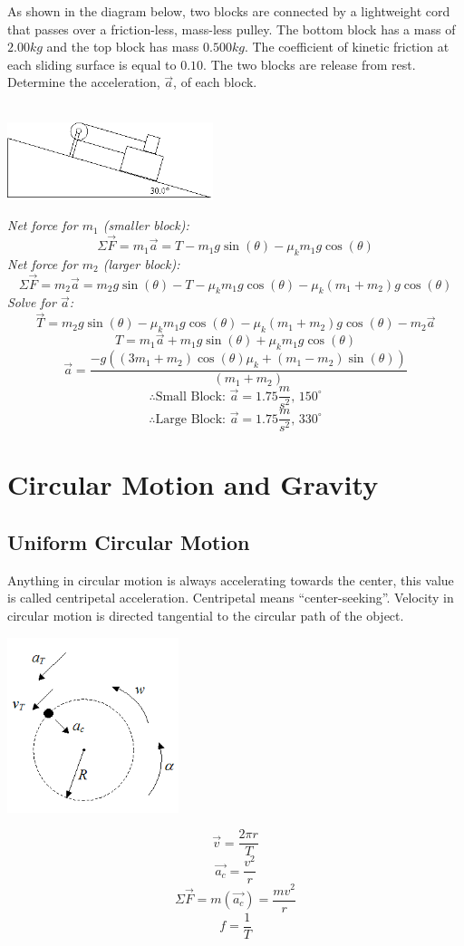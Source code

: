 \documentclass{article}
\begin{document}
\begin{multicols}{2}
  As shown in the diagram below, two blocks are connected by a lightweight cord that passes over a friction-less, mass-less pulley.  The bottom block has a mass of $2.00 kg$ and the top block has mass $0.500 kg$.  The coefficient of kinetic friction at each sliding surface is equal to $0.10$.  The two blocks are release from rest.  Determine the acceleration, $\vec{a}$, of each block.\\\\
  \vfill
  \centerline{\includegraphics[width=6cm]{frictionPlane.png}}
  \vfill
  \columnbreak
  \noindent\textit{Net force for $m_1$ (smaller block):}
  \[
  \Sigma\vec{F}=m_1\vec{a}=T-m_1 g\sin(\theta)-\mu_km_1g\cos(\theta)
  \]
  \textit{Net force for $m_2$ (larger block):}
  \[
  \Sigma\vec{F}=m_2\vec{a}=m_2g\sin(\theta)-T-\mu_km_1g\cos(\theta)-\mu_k(m_1+m_2)g\cos(\theta)
  \]
  \textit{Solve for $\vec{a}$:}
  \[
  \vec{T}=m_2g\sin(\theta)-\mu_km_1g\cos(\theta)-\mu_k(m_1+m_2)g\cos(\theta)-m_2\vec{a}
  \]
  \[
  T=m_1\vec{a}+m_1 g\sin(\theta)+\mu_km_1g\cos(\theta)
  \]
  \[
  \vec{a}=\frac
      {-g((3m_1+m_2)\cos(\theta)\mu_k+(m_1-m_2)\sin(\theta))}
      {(m_1+m_2)}
      \]
      \[
      \therefore\text{Small Block: }\vec{a}=1.75\frac{m}{s^2} \text{, $150^{\circ}$}
      \]
      \[
      \therefore\text{Large Block: }\vec{a}=1.75\frac{m}{s^2} \text{, $330^{\circ}$}
      \]
\end{multicols}

\section{Circular Motion and Gravity}

\subsection{Uniform Circular Motion}
Anything in circular motion is always accelerating towards the center, this value is called centripetal acceleration. Centripetal means ``center-seeking''. Velocity in circular motion is directed tangential to the circular path of the object.
\begin{multicols}{2}
  \centerline{\includegraphics[width=5cm]{circularMotion.png}}
  \columnbreak
  \[
  \vec{v}=\frac{2\pi r}{T}
  \]
  \[
  \vec{a_c}=\frac{v^2}{r}
  \]
  \[
  \Sigma\vec{F}=m(\vec{a_c})=\frac{mv^2}{r}
  \]
  \[
  f=\frac{1}{T}
  \]
\end{multicols}
\end{document}
